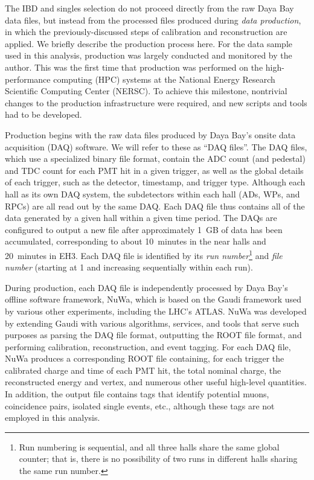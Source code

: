 \documentclass[../thesis.tex]{subfiles}
\begin{document}
The IBD and singles selection do not proceed directly from the raw Daya Bay data files, but instead from the processed files produced during \emph{data production}, in which the previously-discussed steps of calibration and reconstruction are applied. We briefly describe the production process here. For the data sample used in this analysis, production was largely conducted and monitored by the author. This was the first time that production was performed on the high-performance computing (HPC) systems at the National Energy Research Scientific Computing Center (NERSC). To achieve this milestone, nontrivial changes to the production infrastructure were required, and new scripts and tools had to be developed.

Production begins with the raw data files produced by Daya Bay's onsite data acquisition (DAQ) software. We will refer to these as ``DAQ files''. The DAQ files, which use a specialized binary file format, contain the ADC count (and pedestal) and TDC count for each PMT hit in a given trigger, as well as the global details of each trigger, such as the detector, timestamp, and trigger type. Although each hall as its own DAQ system, the subdetectors within each hall (ADs, WPs, and RPCs) are all read out by the same DAQ. Each DAQ file thus contains all of the data generated by a given hall within a given time period. The DAQs are configured to output a new file after approximately 1~GB of data has been accumulated, corresponding to about 10~minutes in the near halls and 20~minutes in EH3. Each DAQ file is identified by its \emph{run number}\footnote{Run numbering is sequential, and all three halls share the same global counter; that is, there is no possibility of two runs in different halls sharing the same run number.} and \emph{file number} (starting at 1 and increasing sequentially within each run).

During production, each DAQ file is independently processed by Daya Bay's offline software framework, NuWa, which is based on the Gaudi \cite{gaudi} framework used by various other experiments, including the LHC's ATLAS. NuWa was developed by extending Gaudi with various algorithms, services, and tools that serve such purposes as parsing the DAQ file format, outputting the ROOT file format, and performing calibration, reconstruction, and event tagging. For each DAQ file, NuWa produces a corresponding ROOT file containing, for each trigger the calibrated charge and time of each PMT hit, the total nominal charge, the reconstructed energy and vertex, and numerous other useful high-level quantities. In addition, the output file contains tags that identify potential muons, coincidence pairs, isolated single events, etc., although these tags are not employed in this analysis.
\end{document}
